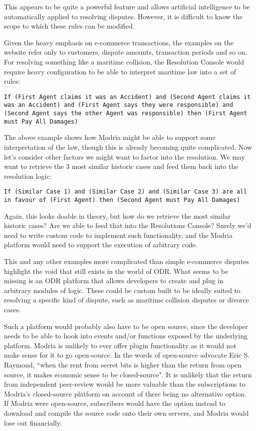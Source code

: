 This appears to be quite a powerful feature and allows artificial intelligence to be automatically applied to resolving disputes. However, it is difficult to know the scope to which these rules can be modified.

Given the heavy emphasis on e-commerce transactions, the examples on the website refer only to customers, dispute amounts, transaction periods and so on. For resolving something like a maritime collision, the Resolution Console would require heavy configuration to be able to interpret maritime law into a set of rules:

\begin{lstlisting}
If (First Agent claims it was an Accident) and (Second Agent claims it was an Accident) and (First Agent says they were responsible) and (Second Agent says the other Agent was responsible) then (First Agent must Pay All Damages)
\end{lstlisting}

The above example shows how Modria might be able to support some interpretation of the law, though this is already becoming quite complicated. Now let's consider other factors we might want to factor into the resolution. We may want to retrieve the 3 most similar historic cases and feed them back into the resolution logic:

\begin{lstlisting}
If (Similar Case 1) and (Similar Case 2) and (Similar Case 3) are all in favour of (First Agent) then (Second Agent must Pay All Damages)
\end{lstlisting}

Again, this looks doable in theory, but how do we retrieve the most similar historic cases? Are we able to feed that into the Resolutions Console? Surely we'd need to write custom code to implement such functionality, and the Modria platform would need to support the execution of arbitrary code.

This and any other examples more complicated than simple e-commerce disputes highlight the void that still exists in the world of ODR. What seems to be missing is an ODR platform that allows developers to create and plug in arbitrary modules of logic. These could be custom built to be ideally suited to resolving a specific kind of dispute, such as maritime collision disputes or divorce cases.

Such a platform would probably also have to be open source, since the developer needs to be able to hook into events and/or functions exposed by the underlying platform. Modria is unlikely to ever offer plugin functionality as it would not make sense for it to go open-source. In the words of open-source advocate Eric S. Raymond, ``when the rent from secret bits is higher than the return from open source, it makes economic sense to be closed-source". It is unlikely that the return from independent peer-review would be more valuable than the subscriptions to Modria's closed-source platform on account of there being no alternative option. If Modria were open-source, subscribers would have the option instead to download and compile the source code onto their own servers, and Modria would lose out financially.

